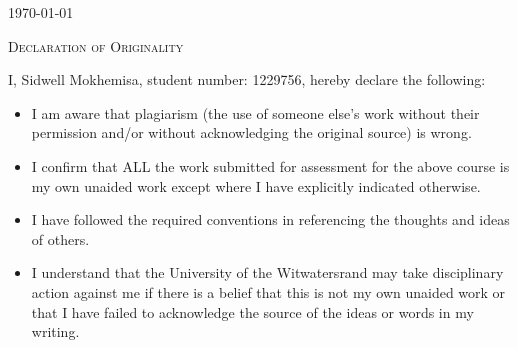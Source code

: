 \documentclass[12pt]{article} %
\begin{document}
\begin{titlepage}
			{\large \today}\\[3cm] %
			
			
			\vfill %
			
				
	\end{titlepage}
	
		\newpage
		\begin{flushleft}\large
			\textsc{Declaration of Originality}\\
		\end{flushleft}
		
		I, Sidwell Mokhemisa, student number: 1229756, hereby declare the following:
		
		\begin{itemize}
			\item I am aware that plagiarism (the use of someone else’s work without their permission and/or without acknowledging the original source) is wrong.
			\item I confirm that ALL the work submitted for assessment for the above course is my own unaided work except where I have explicitly indicated otherwise.
			\item I have followed the required conventions in referencing the thoughts and ideas of others.
			\item I understand that the University of the Witwatersrand may take disciplinary action against me if there is a belief that this is not my own unaided work or that I have failed to acknowledge the source of the ideas or words in my writing.\\
			\\
			\\
		\end{itemize}
	
		\begin{figure}[H] %
			\label{fig:speciation}
		\end{figure}
		
\end{document}

